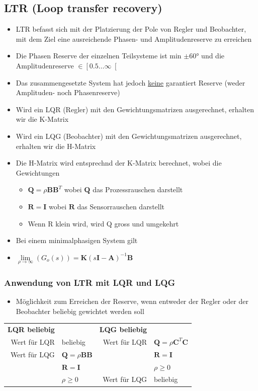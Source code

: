 \subsection{LTR (Loop transfer recovery)} 
\begin{itemize}
	\item LTR befasst sich mit der Platzierung der Pole von Regler und Beobachter, mit dem Ziel eine ausreichende Phasen- und Amplitudenreserve zu erreichen
	\item Die Phasen Reserve der einzelnen Teilsysteme ist min $\pm$\ang{60} und die Amplitudenreserve $\in \left[0.5\right. \ldots \infty \left.\right[$
	\item Das zusammengesetzte System hat jedoch \underline{keine} garantiert Reserve (weder Amplituden- noch Phasenreserve)
	\item Wird ein LQR (Regler) mit den Gewichtungsmatrizen ausgerechnet, erhalten wir die K-Matrix
	\item Wird ein LQG (Beobachter) mit den Gewichtungsmatrizen ausgerechnet, erhalten wir die H-Matrix
	\item Die H-Matrix wird entsprechnd der K-Matrix berechnet, wobei die Gewichtungen 
	\begin{itemize}
		\item $\boldsymbol{Q} = \rho \boldsymbol{BB}^T$ wobei $\boldsymbol{Q}$ das Prozessrauschen darstellt
		\item $\boldsymbol{R} = \boldsymbol{I}$ wobei $\boldsymbol{R}$ das Sensorrauschen darstellt
		\item Wenn R klein wird, wird Q gross und umgekehrt
	\end{itemize} 
	\item Bei einem minimalphasigen System gilt
	\item[] $\lim\limits_{\rho\rightarrow \infty}\left(G_o(s)\right) = \boldsymbol{K}\left(s\boldsymbol{I}-\boldsymbol{A}\right)^{-1}\boldsymbol{B}$
\end{itemize}

\subsubsection{Anwendung von LTR mit LQR und LQG}
\begin{itemize}
	\item Möglichkeit zum Erreichen der Reserve, wenn entweder der Regler oder der Beobachter beliebig gewichtet werden soll
\end{itemize}




\begin{tabularx}{\linewidth}{rp{.1\linewidth} rp{.1\linewidth}}
	\textbf{LQR beliebig}		&		&							\hspace{2.5cm} \textbf{LQG beliebig}& \\				
	Wert für LQR	&beliebig 										& 	Wert für LQR	&$\boldsymbol{Q} = \rho\boldsymbol{C}^T\boldsymbol{C}$\\
	Wert für LQG	&$\boldsymbol{Q} = \rho\boldsymbol{BB}$			& &	$\boldsymbol{R} = \boldsymbol{I}$ \\
					&$\boldsymbol{R} = \boldsymbol{I}$				& &	$\rho \ge 0$\\
					&$\rho \ge 0$									&Wert für LQG &beliebig	
\end{tabularx}
\newpage